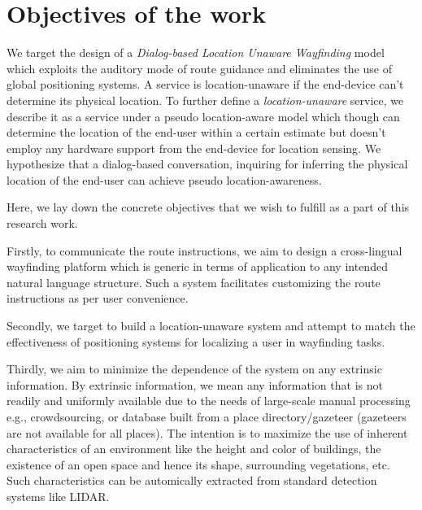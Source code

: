 \documentclass{iitkthesis}
\begin{document}
\iffalse
[Driving with navigational instructions:
Investigating user behaviour and
performance

Individual differences in navigational strategy:
             implications for display design
                      Carryl L. Baldwin*
Psychology Department, George Mason University, Fairfax, VA, USA
]

For fast reaction:
R. Srinivasan, P.P. Jovanis
Effect of selected in-vehicle route guidance systems on driver reaction times
Human Factors, 39 (2) (1997), pp. 200–215
R. Srinivasan, P.P. Jovanis
Effect of in-vehicle route guidance systems on driver workload and choice of vehicle speed: Findings from a driving simulator experiment
\fi

 \section{Objectives of the work}
We target the design of a \textit{Dialog-based Location Unaware Wayfinding} model which exploits the auditory mode of route guidance and eliminates the use of global positioning systems. A service is location-unaware if the end-device can't determine its physical location. To further define a \textit{location-unaware} service, we describe it as a service under a pseudo location-aware model which though can determine the location of the end-user within a certain estimate but doesn't employ any hardware support from the end-device for location sensing. We hypothesize that a dialog-based conversation, inquiring for inferring the physical location of the end-user can achieve pseudo location-awareness. 

Here, we lay down the concrete objectives that we wish to fulfill as a part of this research work.

Firstly, to communicate the route instructions, we aim to design a cross-lingual wayfinding platform which is generic in terms of application to any intended natural language structure. Such a system facilitates customizing the route instructions as per user convenience.

Secondly, we target to build a location-unaware system and attempt to match the effectiveness of positioning systems for localizing a user in wayfinding tasks. 

Thirdly, we aim to minimize the dependence of the system on any extrinsic information. By extrinsic information, we mean any information that is not readily and uniformly available due to the needs of large-scale manual processing e.g., crowdsourcing, or database built from a place directory/gazeteer (gazeteers are not available for all places). The intention is to maximize the use of inherent characteristics of an environment like the height and color of buildings, the existence of an open space and hence its shape, surrounding vegetations, etc. Such characteristics can be automically extracted from standard detection systems like LIDAR.
\end{document}
